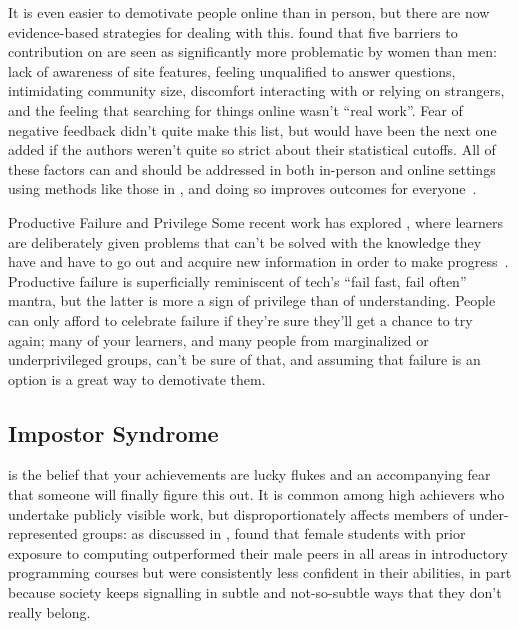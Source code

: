 It is even easier to demotivate people online than in person,
but there are now evidence-based strategies for dealing with this.
\cite{Ford2016} found that five barriers to contribution on 
are seen as significantly more problematic by women than men:
lack of awareness of site features,
feeling unqualified to answer questions,
intimidating community size,
discomfort interacting with or relying on strangers,
and the feeling that searching for things online wasn't ``real work''.
Fear of negative feedback didn't quite make this list,
but would have been the next one added if the authors weren't quite so strict about their statistical cutoffs.
All of these factors can and should be addressed in both in-person and online settings
using methods like those in ,
and doing so improves outcomes for everyone~\cite{Sved2016}.

\begin{aside}{Productive Failure and Privilege}
  Some recent work has explored ,
  where learners are deliberately given problems that can't be solved with the knowledge they have
  and have to go out and acquire new information in order to make progress~\cite{Kapu2016}.
  Productive failure is superficially reminiscent of tech's ``fail fast, fail often'' mantra,
  but the latter is more a sign of privilege than of understanding.
  People can only afford to celebrate failure if they're sure they'll get a chance to try again;
  many of your learners,
  and many people from marginalized or underprivileged groups,
  can't be sure of that,
  and assuming that failure is an option is a great way to demotivate them.
\end{aside}

\subsection*{Impostor Syndrome}

 is the belief that
your achievements are lucky flukes
and an accompanying fear that someone will finally figure this out.
It is common among high achievers who undertake publicly visible work,
but disproportionately affects members of under-represented groups:
as discussed in ,
\cite{Wilc2018} found that
female students with prior exposure to computing outperformed their male peers in all areas in introductory programming courses
but were consistently less confident in their abilities,
in part because society keeps signalling in subtle and not-so-subtle ways
that they don't really belong.

